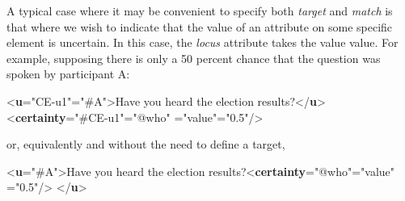 A typical case where it may be convenient to specify both {\itshape target} and {\itshape match} is that where we wish to indicate that the value of an attribute on some specific element is uncertain. In this case, the {\itshape locus} attribute takes the value value. For example, supposing there is only a 50 percent chance that the question was spoken by participant A: \par\bgroup{}\exampleFont \begin{shaded}\noindent\mbox{}{<\textbf{u}\hspace*{1em}{xml:id}="{CE-u1}"\hspace*{1em}{who}="{\#A}">}Have you heard the election results?{</\textbf{u}>}\mbox{}\newline 
{<\textbf{certainty}\hspace*{1em}{target}="{\#CE-u1}"\hspace*{1em}{match}="{@who}"\mbox{}\newline 
\hspace*{1em}{locus}="{value}"\hspace*{1em}{degree}="{0.5}"/>}\end{shaded}\egroup\par \noindent  or, equivalently and without the need to define a target, \par\bgroup{}\exampleFont \begin{shaded}\noindent\mbox{}{<\textbf{u}\hspace*{1em}{who}="{\#A}">}Have you heard the election results?{<\textbf{certainty}\hspace*{1em}{match}="{@who}"\hspace*{1em}{locus}="{value}"\mbox{}\newline 
\hspace*{1em}\hspace*{1em}{degree}="{0.5}"/>}\mbox{}\newline 
{</\textbf{u}>}\end{shaded}\egroup\par \par
